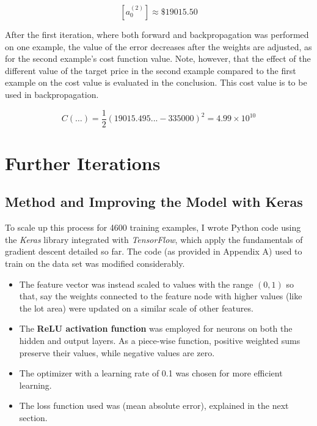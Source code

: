 \documentclass[12pt,a4paper]{article}
\begin{document}
\begin{equation}
\left[a_0^{\left(2\right)}\right] \approx \$19015.50
\end{equation}

After the first iteration, where both forward and backpropagation was performed on one example, the value of the error decreases after the weights are adjusted, as for the second example’s cost function value. Note, however, that the effect of the different value of the target price in the second example compared to the first example on the cost value is evaluated in the conclusion. This cost value is to be used in backpropagation.

\begin{equation}
C\left(\ldots\right)= \frac{1}{2}\left(19015.495... - 335000\right)^2 =  4.99 \times{10}^{10}
\end{equation}


\section{Further Iterations}

\subsection{Method and Improving the Model with Keras}

To scale up this process for 4600 training examples, I wrote Python code using the \textit{Keras} library integrated with \textit{TensorFlow}, which apply the fundamentals of gradient descent detailed so far. The code (as provided in Appendix A) used to train on the data set was modified considerably. 

\begin{itemize}
    \item The feature vector was instead scaled to values with the range $(0,1)$ so that, say the weights connected to the feature node with higher values (like the lot area) were updated on a similar scale of other features.
    \item The \textbf{ReLU activation function} was employed for neurons on both the hidden and output layers. As a piece-wise function, positive weighted sums preserve their values, while negative values are zero.
    \item The  optimizer with a learning rate of 0.1 was chosen for more efficient learning.
    \item The loss function used was  (mean absolute error), explained in the next section.
\end{itemize}
\end{document}
